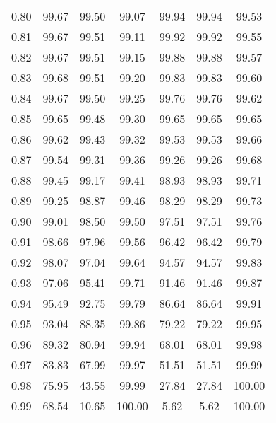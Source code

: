 \begin{tabular}{|c|c|c|c|c|c|c|}
      0.80 &     99.67 &     99.50 &      99.07 &   99.94 &      99.94 &         99.53 \\
      0.81 &     99.67 &     99.51 &      99.11 &   99.92 &      99.92 &         99.55 \\
      0.82 &     99.67 &     99.51 &      99.15 &   99.88 &      99.88 &         99.57 \\
      0.83 &     99.68 &     99.51 &      99.20 &   99.83 &      99.83 &         99.60 \\
      0.84 &     99.67 &     99.50 &      99.25 &   99.76 &      99.76 &         99.62 \\
      0.85 &     99.65 &     99.48 &      99.30 &   99.65 &      99.65 &         99.65 \\
      0.86 &     99.62 &     99.43 &      99.32 &   99.53 &      99.53 &         99.66 \\
      0.87 &     99.54 &     99.31 &      99.36 &   99.26 &      99.26 &         99.68 \\
      0.88 &     99.45 &     99.17 &      99.41 &   98.93 &      98.93 &         99.71 \\
      0.89 &     99.25 &     98.87 &      99.46 &   98.29 &      98.29 &         99.73 \\
      0.90 &     99.01 &     98.50 &      99.50 &   97.51 &      97.51 &         99.76 \\
      0.91 &     98.66 &     97.96 &      99.56 &   96.42 &      96.42 &         99.79 \\
      0.92 &     98.07 &     97.04 &      99.64 &   94.57 &      94.57 &         99.83 \\
      0.93 &     97.06 &     95.41 &      99.71 &   91.46 &      91.46 &         99.87 \\
      0.94 &     95.49 &     92.75 &      99.79 &   86.64 &      86.64 &         99.91 \\
      0.95 &     93.04 &     88.35 &      99.86 &   79.22 &      79.22 &         99.95 \\
      0.96 &     89.32 &     80.94 &      99.94 &   68.01 &      68.01 &         99.98 \\
      0.97 &     83.83 &     67.99 &      99.97 &   51.51 &      51.51 &         99.99 \\
      0.98 &     75.95 &     43.55 &      99.99 &   27.84 &      27.84 &        100.00 \\
      0.99 &     68.54 &     10.65 &     100.00 &    5.62 &       5.62 &        100.00 \\
\bottomrule
\end{tabular}
